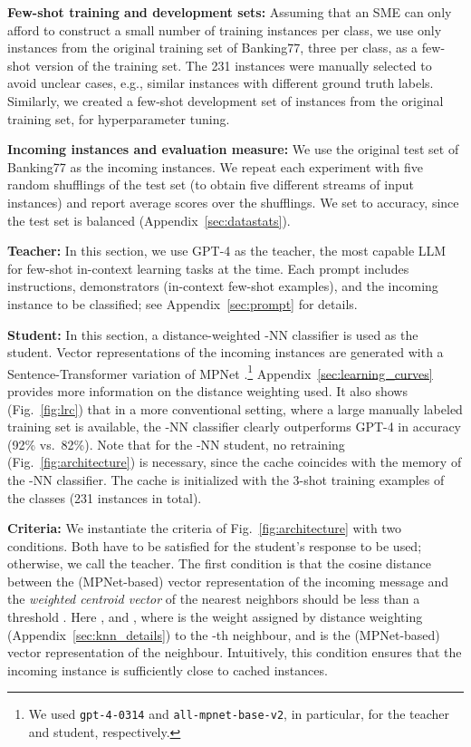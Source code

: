 \documentclass[11pt]{article}
\begin{document}
\vspace{1mm}\noindent\textbf{Few-shot training and development sets:} 
Assuming that an SME can only afford to construct a small number of training instances per class, we use only  instances from the original training set of Banking77, three per class, as a few-shot version of the training set. The 231 instances were manually selected to avoid unclear cases, e.g., similar instances with different ground truth labels. Similarly, we created a few-shot development set of  instances from the original training set, for hyperparameter tuning.


\vspace{1mm}\noindent\textbf{Incoming instances and evaluation measure:} We use the original test set of Banking77 as the incoming instances. We repeat each experiment with five random shufflings of the test set (to obtain five different streams of input instances) and report average scores over the shufflings. We set  to accuracy, since the test set is balanced (Appendix~\ref{sec:datastats}). 

\vspace{1mm}\noindent\textbf{Teacher:} 
In this section, we use GPT-4 \cite{OpenAI2023GPT4TR} as the teacher, the most capable LLM for few-shot in-context learning tasks at the time. Each prompt includes instructions, demonstrators (in-context few-shot examples), and the incoming instance to be classified; see Appendix~\ref{sec:prompt} for details.

\vspace{1mm}\noindent\textbf{Student:} 
In this section, a distance-weighted -NN classifier is used as the student. Vector representations of the incoming instances are generated with a Sentence-Transformer \cite{reimers-gurevych-2019-sentence} variation of MPNet \cite{song2020mpnet}.\footnote{We used \texttt{gpt-4-0314} and \texttt{all-mpnet-base-v2}, in particular, for the teacher and student, respectively.} Appendix~\ref{sec:learning_curves} provides more information on the distance weighting used. It also shows (Fig.~\ref{fig:lrc}) that in a more conventional setting, where a large manually labeled training set is available, the -NN classifier clearly outperforms GPT-4 in accuracy (92\% vs.\ 82\%). Note that for the -NN student, no retraining (Fig.~\ref{fig:architecture}) is necessary, since the cache coincides with the memory of the -NN classifier. The cache is initialized with the 3-shot training examples of the classes (231 instances in total). 

\vspace{1mm}\noindent\textbf{Criteria:} We instantiate the criteria of Fig.~\ref{fig:architecture} with two conditions. Both have to be satisfied for the student's response to be used; otherwise, we call the teacher. The first condition is that the cosine distance between the (MPNet-based) vector representation of the incoming message and the \emph{weighted centroid vector}  of the  nearest neighbors should be less than a threshold . Here
, 
and , where  is the weight assigned by distance weighting (Appendix~\ref{sec:knn_details}) to the -th neighbour, and  is the (MPNet-based) vector representation of the neighbour. Intuitively, this condition ensures that the incoming instance is sufficiently close to cached instances.
\end{document}
